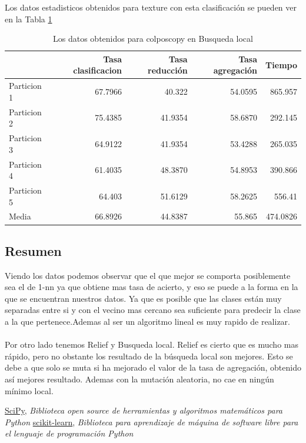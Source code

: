 \documentclass[12pt,a4paper]{article}
\begin{document}
Los datos estadisticos obtenidos para texture con esta clasificación se pueden ver en la Tabla \ref{tab:btexture}
\begin{table}[H]
	\centering
	\caption {Los datos obtenidos para colposcopy en Busqueda local} \label{tab:btexture} 
	
	\begin{tabular}{|l|r|r|r|r|}
		\hline
		& Tasa clasificacion &Tasa reducción &Tasa agregación & Tiempo\\
		\hline
		Particion 1 & 67.7966 &40.322 & 54.0595& 865.957 \\
		\hline
		Particion 2 & 75.4385 & 41.9354& 58.6870& 292.145\\
		\hline
		Particion 3 &64.9122 & 41.9354& 53.4288& 265.035\\
		\hline
		Particion 4 & 61.4035 & 48.3870&54.8953 &  390.866\\
		\hline
		Particion 5 & 64.403 & 51.6129&58.2625 & 556.41 \\
		\hline
		Media &  66.8926 &44.8387 &55.865 & 474.0826 \\
		\hline
	\end{tabular}
\end{table}
\subsection{Resumen}
Viendo los datos podemos observar que el que mejor se comporta posiblemente sea el de 1-nn ya que obtiene mas tasa de acierto, y eso se puede a la forma en la que se encuentran nuestros datos. Ya que es posible que las clases están muy separadas entre si y con el vecino mas cercano sea suficiente para predecir la clase a la que pertenece.Ademas al ser un algoritmo lineal es muy rapido de realizar. \\\\
Por otro lado tenemos Relief y Busqueda local. Relief es cierto que es mucho mas rápido, pero no obstante los resultado de la búsqueda local son mejores. Esto se debe a que solo se muta si ha mejorado el valor de la tasa de agregación, obtenido así mejores resultado. Ademas con la mutación aleatoria, no cae en ningún mínimo local.
\clearpage
\begin{thebibliography}{H}
	 \href{www.scipy.org}{SciPy},
	\textit{Biblioteca open source de herramientas y algoritmos matemáticos para Python } 
	 \href{https://scikit-learn.org}{scikit-learn},
	\textit{Biblioteca para aprendizaje de máquina de software libre para el lenguaje de programación Python} 
\end{thebibliography}
\end{document}
